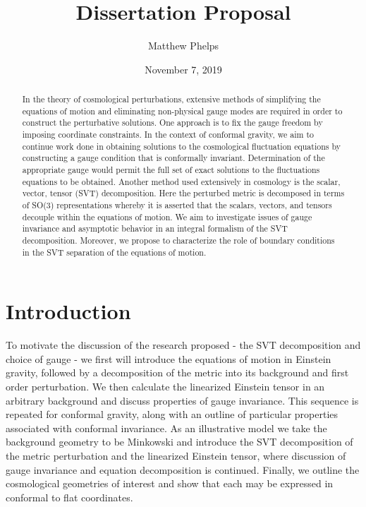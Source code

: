 \documentclass[10pt,letterpaper]{article}
\title{Dissertation Proposal}
\date{November 7, 2019}
\author{Matthew Phelps}
\numberwithin{equation}{section}
\begin{document}
 
\maketitle
\newpage
\tableofcontents
\newpage
%
\begin{abstract}
In the theory of cosmological perturbations, extensive methods of simplifying the equations of motion and eliminating non-physical gauge modes are required in order to construct the perturbative solutions. One approach is to fix the gauge freedom by imposing coordinate constraints. In the context of conformal gravity, we aim to continue work done in obtaining solutions to the cosmological fluctuation equations \cite{Mannheim2012a} by constructing a gauge condition that is conformally invariant. Determination of the appropriate gauge would permit the full set of exact solutions to the fluctuations equations to be obtained. Another method used  extensively in cosmology is the scalar, vector, tensor (SVT) decomposition\cite{Ellis2012}. Here the perturbed metric is decomposed in terms of SO(3) representations whereby it is asserted that the scalars, vectors, and tensors decouple within the equations of motion. We aim to investigate issues of gauge invariance and asymptotic behavior in an integral formalism of the SVT decomposition. Moreover, we propose to characterize the role of boundary conditions in the SVT separation of the equations of motion.
\end{abstract}

\section{Introduction}
To motivate the discussion of the research proposed - the SVT decomposition and choice of gauge - we first will introduce the equations of motion in Einstein gravity, followed by a decomposition of the metric into its background and first order perturbation. We then calculate the linearized Einstein tensor in an arbitrary background and discuss properties of gauge invariance. This sequence is repeated for conformal gravity, along with an outline of particular properties associated with conformal invariance. As an illustrative model we take the background geometry to be Minkowski and introduce the SVT decomposition of the metric perturbation and the linearized Einstein tensor, where discussion of gauge invariance and equation decomposition is continued. Finally, we outline the cosmological geometries of interest and show that each may be expressed in conformal to flat coordinates. 
%
\end{document}

